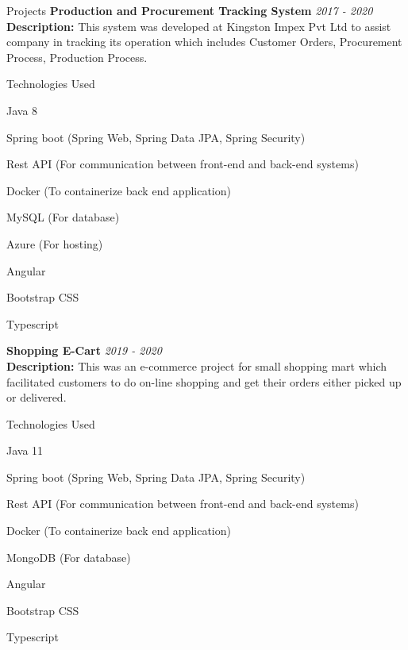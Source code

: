 \documentclass{resume}
\begin{document}
\begin{rSection}{Projects}
{\bf Production and Procurement Tracking System} \hfill {\em  2017 - 2020} 
\\{\bf Description:} This system was developed at Kingston Impex Pvt Ltd to assist company in tracking its operation which includes Customer Orders, Procurement Process, Production Process.

\begin{rSubsection}{Technologies Used}{}{}{}
\item Java 8
\item Spring boot (Spring Web, Spring Data JPA, Spring Security)
\item Rest API (For communication between front-end and back-end systems)
\item Docker (To containerize back end application)
\item MySQL (For database)
\item Azure (For hosting)


\item Angular
\item Bootstrap CSS
\item Typescript
\end{rSubsection}

{\bf Shopping E-Cart} \hfill {\em  2019 - 2020} 
\\{\bf Description:} This was an e-commerce project for small shopping mart which facilitated customers to do on-line shopping and get their orders either picked up or delivered.

\begin{rSubsection}{Technologies Used}{}{}{}
\item Java 11
\item Spring boot (Spring Web, Spring Data JPA, Spring Security)
\item Rest API (For communication between front-end and back-end systems)
\item Docker (To containerize back end application)
\item MongoDB (For database)

\item Angular
\item Bootstrap CSS
\item Typescript
\end{rSubsection}


\end{rSection}
\end{document}

